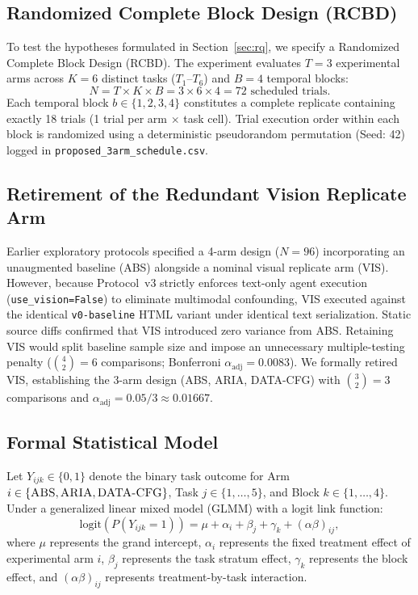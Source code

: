 \documentclass[11pt,a4paper]{article}
\begin{document}
\subsection{Randomized Complete Block Design (RCBD)}
To test the hypotheses formulated in Section~\ref{sec:rq}, we specify a Randomized Complete Block Design (RCBD). The experiment evaluates $T=3$ experimental arms across $K=6$ distinct tasks ($T_1$--$T_6$) and $B=4$ temporal blocks:
\begin{equation}
N = T \times K \times B = 3 \times 6 \times 4 = 72 \text{ scheduled trials}.
\end{equation}
Each temporal block $b \in \{1, 2, 3, 4\}$ constitutes a complete replicate containing exactly 18 trials (1 trial per arm $\times$ task cell). Trial execution order within each block is randomized using a deterministic pseudorandom permutation (Seed: 42) logged in \texttt{proposed\_3arm\_schedule.csv}.

\subsection{Retirement of the Redundant Vision Replicate Arm}
Earlier exploratory protocols specified a 4-arm design ($N=96$) incorporating an unaugmented baseline (\textsc{ABS}) alongside a nominal visual replicate arm (\textsc{VIS}). However, because Protocol~v3 strictly enforces text-only agent execution (\texttt{use\_vision=False}) to eliminate multimodal confounding, \textsc{VIS} executed against the identical \texttt{v0-baseline} HTML variant under identical text serialization. Static source diffs confirmed that \textsc{VIS} introduced zero variance from \textsc{ABS}. Retaining \textsc{VIS} would split baseline sample size and impose an unnecessary multiple-testing penalty ($\binom{4}{2}=6$ comparisons; Bonferroni $\alpha_{\text{adj}} = 0.0083$). We formally retired \textsc{VIS}, establishing the 3-arm design (\textsc{ABS}, \textsc{ARIA}, \textsc{DATA-CFG}) with $\binom{3}{2}=3$ comparisons and $\alpha_{\text{adj}} = 0.05/3 \approx 0.01667$.

\subsection{Formal Statistical Model}
Let $Y_{ijk} \in \{0, 1\}$ denote the binary task outcome for Arm $i \in \{\textsc{ABS}, \textsc{ARIA}, \textsc{DATA-CFG}\}$, Task $j \in \{1, \dots, 5\}$, and Block $k \in \{1, \dots, 4\}$. Under a generalized linear mixed model (GLMM) with a logit link function:
\begin{equation}
\text{logit}\left(P(Y_{ijk} = 1)\right) = \mu + \alpha_i + \beta_j + \gamma_k + (\alpha\beta)_{ij},
\end{equation}
where $\mu$ represents the grand intercept, $\alpha_i$ represents the fixed treatment effect of experimental arm $i$, $\beta_j$ represents the task stratum effect, $\gamma_k$ represents the block effect, and $(\alpha\beta)_{ij}$ represents treatment-by-task interaction.
\end{document}
